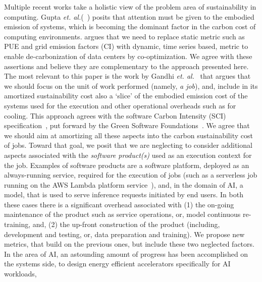 Multiple recent works take a holistic view of the problem 
area of sustainability in computing. Gupta {\em et. al.}(~\cite{gupta2020chasing}) posits that
attention must be given to the embodied emission of systems, which is becoming the dominant 
factor in the carbon cost of computing environments. \cite{chien2020beyond} argues that 
we need to replace static metric such as PUE and grid emission factors (CI) with dynamic, time series based, metric to enable de-carbonization of data centers by co-optimization. We agree with these assertions and believe they are complementary to the approach presented here. The most relevant to this paper is the work by Gandhi {\em et. al.}~\cite{gandhi2022metrics} that argues that we should focus on the unit of work performed (namely, {\em a job}), and, include in its amortized sustainability cost also a `slice' of the embodied emission cost of the systems used for the execution and other operational overheads such as for cooling. This approach agrees with the software Carbon Intensity (SCI) specification~\cite{SCI}, put forward by the Green Software Foundations~\cite{GSF}. We agree that we should aim at amortizing all these aspects into the carbon sustainability cost of jobs. Toward that goal, we posit that we are neglecting to consider additional aspects associated with the {\em software product(s)} used as an execution context for the job. Examples of software products are a software platform, deployed as an always-running service, required for the execution of jobs (such as a serverless job running on the AWS Lambda platform service~\cite{lambda}), and, in the 
domain of AI, a model, that is used to serve inference requests initiated by end users. In both these cases there is a significant overhead associated with (1) the on-going maintenance of the product such as 
service operations, or, model continuous re-training, and, (2) the up-front construction of the product (including, development and testing, or, data preparation and training). We propose new metrics, that build on the previous ones, but include these two neglected factors. \\
%
In the area of AI, an astounding amount of progress has been accomplished on the systems side, to design energy efficient accelerators specifically for AI workloads, 
